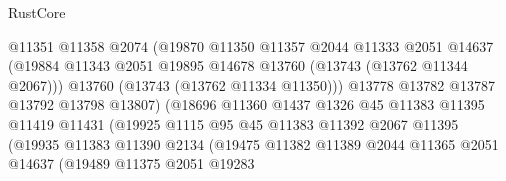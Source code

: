 \begin{lexlean}{RustCore}
\begin{coremodule}
                                    @11351
                                    @11358
                                    @2074
                                    (@19870
                                      @11350
                                      @11357
                                      @2044
                                      @11333
                                      @2051
                                      @14637
                                      (@19884
                                        @11343
                                        @2051
                                        @19895
                                        @14678
                                        @13760
                                        (@13743 (@13762 @11344 @2067)))
                                      @13760
                                      (@13743 (@13762 @11334 @11350)))
                                    @13778
                                    @13782
                                    @13787
                                    @13792
                                    @13798
                                    @13807)
                                  (@18696
                                    @11360
                                    @1437
                                    @1326
                                    @45
                                    @11383
                                    @11395
                                    @11419
                                    @11431
                                    (@19925
                                      @1115
                                      @95
                                      @45
                                      @11383
                                      @11392
                                      @2067
                                      @11395
                                      (@19935
                                        @11383
                                        @11390
                                        @2134
                                        (@19475
                                          @11382
                                          @11389
                                          @2044
                                          @11365
                                          @2051
                                          @14637
                                          (@19489
                                            @11375
                                            @2051
                                            @19283

\end{coremodule}
\end{lexlean}
